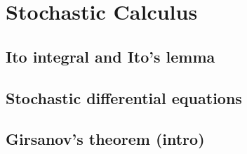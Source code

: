 
\section{Stochastic Calculus}

\subsection{Ito integral and Ito's lemma}


\subsection{Stochastic differential equations}


\subsection{Girsanov's theorem (intro)}

